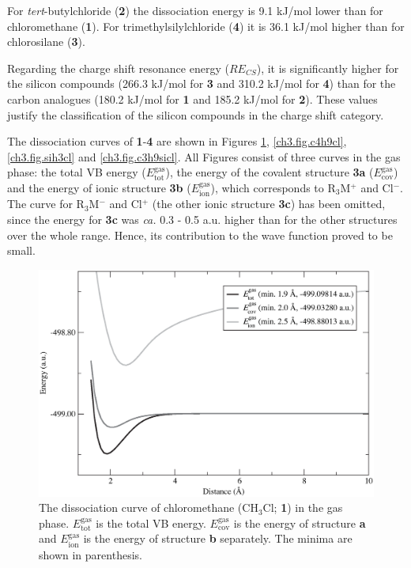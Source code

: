 For \textit{tert}-butylchloride (\textbf{2}) the dissociation energy is 9.1 kJ/mol lower than for chloromethane (\textbf{1}). For trimethylsilylchloride (\textbf{4}) it is 36.1 kJ/mol higher than for chlorosilane (\textbf{3}).

Regarding the charge shift resonance energy ($RE_{CS}$), it is significantly higher for the silicon compounds (266.3 kJ/mol for \textbf{3} and 310.2 kJ/mol for \textbf{4}) than for the carbon analogues (180.2 kJ/mol for \textbf{1} and 185.2 kJ/mol for \textbf{2}). These values justify the classification of the silicon compounds in the charge shift category.

The dissociation curves of \textbf{1}-\textbf{4} are shown in Figures \ref{ch3.fig.ch3cl}, \ref{ch3.fig.c4h9cl}, \ref{ch3.fig.sih3cl} and \ref{ch3.fig.c3h9sicl}. All Figures consist of three curves in the gas phase: the total VB energy ($E_\mathrm{tot}^\mathrm{gas}$), the energy of the covalent structure \textbf{3a} ($E_\mathrm{cov}^\mathrm{gas}$) and the energy of ionic structure \textbf{3b} ($E_\mathrm{ion}^\mathrm{gas}$), which corresponds to R$_3$M$^{+}$ and Cl$^{-}$. The curve for R$_3$M$^{-}$ and Cl$^{+}$ (the other ionic structure \textbf{3c}) has been omitted, since the energy for \textbf{3c} was \textit{ca.} 0.3 - 0.5 a.u. higher than for the other structures over the whole range. Hence, its contribution to the wave function proved to be small.

\begin{figure}[htbp]
\begin{center}
\includegraphics[scale=0.55]{dissociation/figures/ch3cl_g.eps}
\end{center}
\caption{The dissociation curve of chloromethane (CH$_3$Cl; \textbf{1}) in the gas phase. $E_\mathrm{tot}^\mathrm{gas}$ is the total VB energy. $E_\mathrm{cov}^\mathrm{gas}$ is the energy of structure \textbf{a} and $E_\mathrm{ion}^\mathrm{gas}$ is the energy of structure \textbf{b} separately. The minima are shown in parenthesis.}
\label{ch3.fig.ch3cl}
\end{figure}

